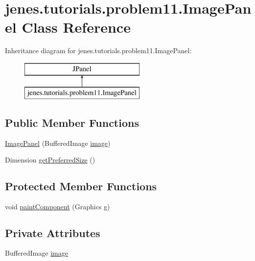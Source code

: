 \hypertarget{classjenes_1_1tutorials_1_1problem11_1_1_image_panel}{\section{jenes.\-tutorials.\-problem11.\-Image\-Panel Class Reference}
\label{classjenes_1_1tutorials_1_1problem11_1_1_image_panel}
}
Inheritance diagram for jenes.\-tutorials.\-problem11.\-Image\-Panel\-:\begin{figure}[H]
\begin{center}
\leavevmode
\includegraphics[height=2.000000cm]{classjenes_1_1tutorials_1_1problem11_1_1_image_panel}
\end{center}
\end{figure}
\subsection*{Public Member Functions}
\begin{DoxyCompactItemize}
\item 
\hyperlink{classjenes_1_1tutorials_1_1problem11_1_1_image_panel_a72e9d512f6d00f9ab6fd18bf052f35fd}{Image\-Panel} (Buffered\-Image \hyperlink{classjenes_1_1tutorials_1_1problem11_1_1_image_panel_a87ad7d0b5c3007bbcb5cac0352d94e3c}{image})
\item 
Dimension \hyperlink{classjenes_1_1tutorials_1_1problem11_1_1_image_panel_afa537b7985f0ccfc8ad9896df39595c7}{get\-Preferred\-Size} ()
\end{DoxyCompactItemize}
\subsection*{Protected Member Functions}
\begin{DoxyCompactItemize}
\item 
void \hyperlink{classjenes_1_1tutorials_1_1problem11_1_1_image_panel_a734663d1d6aeb4f2e02e788db04a1444}{paint\-Component} (Graphics g)
\end{DoxyCompactItemize}
\subsection*{Private Attributes}
\begin{DoxyCompactItemize}
\item 
Buffered\-Image \hyperlink{classjenes_1_1tutorials_1_1problem11_1_1_image_panel_a87ad7d0b5c3007bbcb5cac0352d94e3c}{image}
\end{DoxyCompactItemize}


